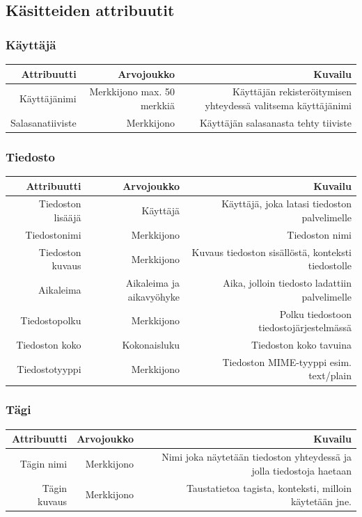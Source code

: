 \documentclass[10pt,a4paper]{article}
\begin{document}
\subsection{Käsitteiden attribuutit}
\subsubsection{Käyttäjä}
\begin{tabularx}{\textwidth}{|R|R|R|} \hline
\textbf{Attribuutti} & \textbf{Arvojoukko} & \textbf{Kuvailu}\\ \hline
Käyttäjänimi & Merkkijono max. 50 merkkiä & Käyttäjän rekisteröitymisen yhteydessä valitsema käyttäjänimi\\ \hline
Salasanatiiviste & Merkkijono & Käyttäjän salasanasta tehty tiiviste\\ \hline
\end{tabularx}

\subsubsection{Tiedosto}
\begin{tabularx}{\textwidth}{|R|R|R|} \hline
\textbf{Attribuutti} & \textbf{Arvojoukko} & \textbf{Kuvailu}\\ \hline
Tiedoston lisääjä & Käyttäjä & Käyttäjä, joka latasi tiedoston palvelimelle\\ \hline
Tiedostonimi & Merkkijono & Tiedoston nimi\\ \hline
Tiedoston kuvaus & Merkkijono & Kuvaus tiedoston sisällöstä, konteksti tiedostolle\\ \hline
Aikaleima & Aikaleima ja aikavyöhyke & Aika, jolloin tiedosto ladattiin palvelimelle\\ \hline
Tiedostopolku & Merkkijono & Polku tiedostoon tiedostojärjestelmässä\\ \hline
Tiedoston koko & Kokonaisluku & Tiedoston koko tavuina\\ \hline
Tiedostotyyppi & Merkkijono & Tiedoston MIME-tyyppi esim. text/plain\\ \hline
\end{tabularx}

\subsubsection{Tägi}
\begin{tabularx}{\textwidth}{|R|R|R|} \hline
\textbf{Attribuutti} & \textbf{Arvojoukko} & \textbf{Kuvailu}\\ \hline
Tägin nimi & Merkkijono & Nimi joka näytetään tiedoston yhteydessä ja jolla tiedostoja haetaan\\ \hline
Tägin kuvaus & Merkkijono & Taustatietoa tagista, konteksti, milloin käytetään jne.\\ \hline
\end{tabularx}
\end{document}
